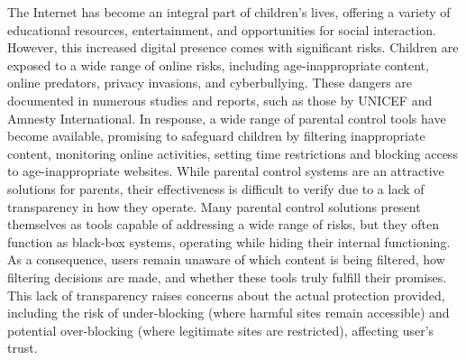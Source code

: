 
The Internet has become an integral part of children’s lives, offering a variety of educational resources, entertainment, and opportunities for social interaction.
However, this increased digital presence comes with significant risks.
Children are exposed to a wide range of online risks, including age-inappropriate content, online predators, privacy invasions, and cyberbullying. 
These dangers are documented in numerous studies and reports, such as those by UNICEF\cite{mariya_stoilova_investigating_2021} and Amnesty International\cite{amnesty_driven_2023}.
In response, a wide range of parental control tools have become available, promising to safeguard children by filtering inappropriate content, monitoring online activities, setting time restrictions and blocking access to age-inappropriate websites.
While parental control systems are an attractive solutions for parents, their effectiveness is difficult to verify due to a lack of transparency in how they operate. 
Many parental control solutions present themselves as tools capable of addressing a wide range of risks, but they often function as black-box systems, operating while hiding their internal functioning. 
As a consequence, users remain unaware of which content is being filtered, how filtering decisions are made, and whether these tools truly fulfill their promises. 
This lack of transparency raises concerns about the actual protection provided, including the risk of under-blocking (where harmful sites remain accessible) and potential over-blocking (where legitimate sites are restricted), affecting user's trust.


